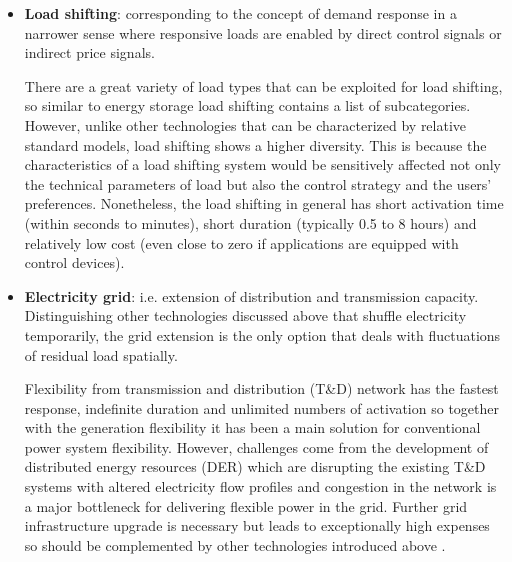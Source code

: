 \begin{itemize}
	
	
	\item \textbf{Load shifting}: corresponding to the concept of demand response in a narrower sense where responsive loads are enabled by direct control signals or indirect price signals.
	
	There are a great variety of load types that can be exploited for load shifting, so similar to energy storage load shifting contains a list of subcategories. However, unlike other technologies that can be characterized by relative standard models, load shifting shows a higher diversity. This is because the characteristics of a load shifting system would be sensitively affected not only the technical parameters of load but also the control strategy and the users' preferences. Nonetheless, the load shifting in general has short activation time (within seconds to minutes), short duration (typically 0.5 to 8 hours) and relatively low cost (even close to zero if applications are equipped with control devices). 

	\item \textbf{Electricity grid}: i.e. extension of distribution and transmission capacity. Distinguishing other technologies discussed above that shuffle electricity temporarily, the grid extension is the only option that deals with fluctuations of residual load spatially. 
	
	Flexibility from transmission and distribution (T\&D) network has the fastest response, indefinite duration and unlimited numbers of activation so together with the generation flexibility it has been a main solution for conventional power system flexibility. However, challenges come from the development of distributed energy resources (DER) which are disrupting the existing T\&D systems with altered electricity flow profiles and congestion in the network is a major bottleneck for delivering flexible power in the grid. Further grid infrastructure upgrade is necessary but leads to exceptionally high expenses so should be complemented by other technologies introduced above \cite{Cochran2014}.
	
\end{itemize}

